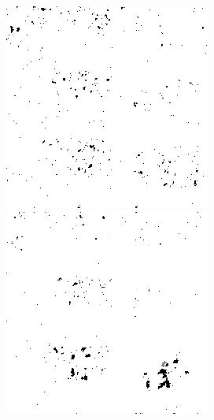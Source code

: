 \begin{figure}[H]
\begin{minipage}[t]{0.245\textwidth}
    \label{fig:noise_15_20}
    \includegraphics[width = \textwidth]{result/noisy/1_15_12.png}
    \label{fig:noise_15_12}
    \includegraphics[width = \textwidth]{result/noisy/1_15_6.png}

\end{minipage}
\end{figure}

